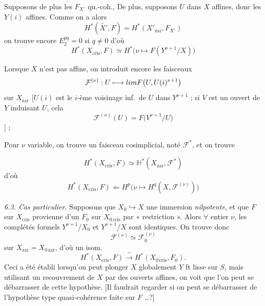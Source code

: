 \documentclass[11pt,a4paper]{article}
\begin{document}

Supposons de plus les $F_{X'}$ qu.-coh.,  De plus, supposons $U$ dans $X$ affines, donc
les $Y(i)$ affines.  Comme on a alors
\[
  H^{*}(\widetilde{X'}, F) = H^{*}(X'_{\mathrm{zar}}, F_{X'})
\]
on trouve encore $E_{2}^{pq} = 0$ si $q \neq 0$ d'où
\[
  H^{*}(X_{\mathrm{cris}}, F) \simeq
  H^{*}\bigl(\nu \mapsto F(Y^{\nu+1}/X)\bigr)
\]

Lorsque $X$ n'est pas affine, on introduit encore les faisceaux
\[
  \mathcal{F}^{(\nu)} : U \longmapsto \varprojlim F\bigl(U, U(i)^{\nu+1}\bigr)
\]
sur $X_{\mathrm{zar}}$ [$U(i)$ est le $i$-ème voisinage inf.\ de $U$ dans
$Y^{\nu+1}$ ; si $V$ est un ouvert de $Y$ induisant $U$, cela
 \ill{}
\[
  \mathcal{F}^{(\nu)}(U) = F\bigl(V^{\nu+1}/U\bigr)
\]
] ;

Pour $\nu$ variable, on trouve un faisceau cosimplicial, 
noté $\mathcal{F}^{*}$, et on trouve


\[
  H^{*}(X_{\mathrm{cris}}, F) \simeq
  \mathbb{H}^{*}(X_{\mathrm{zar}}, \mathcal{F}^{*})
\]
d'où
\[
  H^{*}(X_{\mathrm{cris}}, F) \Longleftarrow
  H^{p}\bigl(\nu \mapsto H^{q}(X, \mathcal{F}^{(\nu)})\bigr)
\]

\emph{6.3. Cas particulier}. Supposons que \struck{\ill{}} $X_0 \hookrightarrow X$ une
immersion \emph{nilpotente},  et que $F$ sur
$X_{\mathrm{cris}}$ provienne d'un $F_0$ sur $X_{0\,\mathrm{cris}}$ par
« restriction ». Alors $\forall$ entier $\nu$, les complétés formels
$Y^{\nu+1}/X_0$ et $Y^{\nu+1}/X$ sont identiques. On trouve donc
\[
  \mathcal{F}^{(\nu)} \simeq \mathcal{F}_0^{(\nu)}
\]
\ill{} sur $X_{\mathrm{zar}} = X_{0\,\mathrm{zar}}$, d'où un isom.
\[
  H^{*}(X_{\mathrm{cris}}, F) \xrightarrow{\ \sim\ }
  H^{*}(X_{0\,\mathrm{cris}}, F_0) .
\]
Ceci a été établi lorsqu'on peut plonger $X$ globalement 
$Y$ ft lisse sur $S$, mais 
utilisant un recouvrement de $X$ par des ouverts affines, on voit que l'on
peut se débarrasser de cette hypothèse. [Il faudrait regarder si on peut se
débarrasser de l'hypothèse type quasi-cohérence faite sur $F$ \ldots ?]
\end{document}
